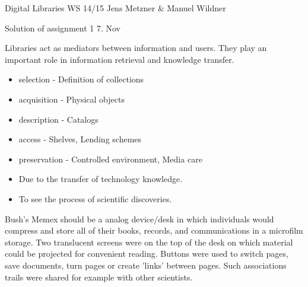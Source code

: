 \documentclass[10pt,a4paper]{scrartcl}
\begin{document}
\uebkopfzeile
  {Digital Libraries} %
  {WS 14/15}  %
  {}    %
  {Jens Metzner \& Manuel Wildner}    %

\uebtitel
{Solution of assignment 1} %
{7. Nov} %


Libraries act as mediators between information and users. They play an important role in information retrieval and knowledge transfer.
\begin{itemize}
  \item selection - Definition of collections
  \item acquisition - Physical objects
  \item description - Catalogs
  \item access - Shelves, Lending schemes
  \item preservation - Controlled environment, Media care
\end{itemize}




\begin{itemize}
  \item Due to the transfer of technology knowledge.
  \item To see the process of scientific discoveries.
\end{itemize}


Bush's Memex should be a analog device/desk in which individuals would compress and store all of their books, records, and communications in a microfilm storage. Two translucent screens were on the top of the desk on which material could be projected for convenient reading. Buttons were used to switch pages, save documents, turn pages or create 'links' between pages. Such associations trails were shared for example with other scientists.

\end{document}
